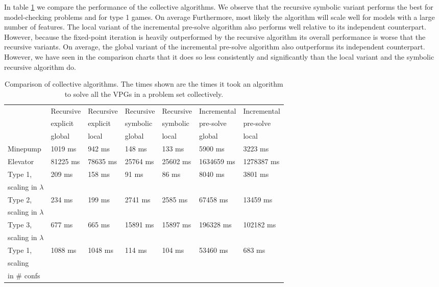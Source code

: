 In table \ref{tab_compare_collective_algs} we compare the performance of the collective algorithms.
We observe that the recursive symbolic variant performs the best for model-checking problems and for type 1 games. On average  Furthermore, most likely the algorithm will scale well for models with a large number of features. The local variant of the incremental pre-solve algorithm also performs well relative to its independent counterpart. However, because the fixed-point iteration is heavily outperformed by the recursive algorithm its overall performance is worse that the recursive variants. On average, the global variant of the incremental pre-solve algorithm also outperforms its independent counterpart. However, we have seen in the comparison charts that it does so less consistently and significantly than the local variant and the symbolic recursive algorithm do.
\begin{table}[h]
	\centering
	\begin{tabular}{|l|l|l|l|l|l|l|}
		\hline
		& Recursive&Recursive &Recursive &Recursive & Incremental& Incremental\\
		& explicit &explicit & symbolic &symbolic & pre-solve &pre-solve\\
		& global & local &global  & local & global & local
		\\ \hline
		Minepump& 1019 ms& 942 ms& 148 ms& 133 ms& 5900 ms& 3223 ms\\ \hline
		Elevator& 81225 ms& 78635 ms& 25764 ms& 25602 ms& 1634659 ms& 1278387 ms\\ \hline
		Type 1, & \multirow{2}{*}{209 ms}& \multirow{2}{*}{158 ms} & \multirow{2}{*}{91 ms} & \multirow{2}{*}{86 ms} & \multirow{2}{*}{8040 ms} & \multirow{2}{*}{3801 ms}\\
		scaling in $\lambda$& & & & & &\\ \hline
		Type 2,& \multirow{2}{*}{234 ms} & \multirow{2}{*}{199 ms} & \multirow{2}{*}{2741 ms} & \multirow{2}{*}{2585 ms} & \multirow{2}{*}{67458 ms} & \multirow{2}{*}{13459 ms} \\
		scaling in $\lambda$& & & & & &\\ \hline
		Type 3,& \multirow{2}{*}{677 ms} & \multirow{2}{*}{665 ms} & \multirow{2}{*}{15891 ms} & \multirow{2}{*}{15897 ms} & \multirow{2}{*}{196328 ms} & \multirow{2}{*}{102182 ms}\\ 
		scaling in $\lambda$& & & & & &\\ \hline
		Type 1,& \multirow{3}{*}{1088 ms} & \multirow{3}{*}{1048 ms} & \multirow{3}{*}{114 ms} & \multirow{3}{*}{104 ms} & \multirow{3}{*}{53460 ms} & \multirow{3}{*}{683 ms} \\
		scaling& & & & & &\\
		in \# confs& & & & & &\\ \hline
	\end{tabular}
	\caption{Comparison of collective algorithms. The times shown are the times it took an algorithm to solve all the VPGs in a problem set collectively.}
	\label{tab_compare_collective_algs}
\end{table}

